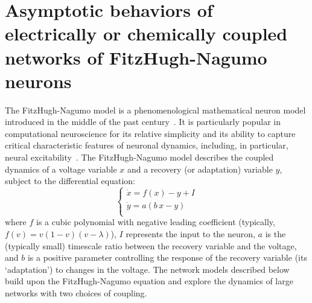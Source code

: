 \documentclass[onefignum,onetabnum]{siamart190516}
\newcommand{\1}{\mathbbm{1}}
\newcommand{\review}[1]{\textcolor{midblue}{ #1}}
\renewcommand{\review}[1]{{ #1}}
\begin{document}
\section{Asymptotic behaviors of electrically or chemically coupled networks of FitzHugh-Nagumo neurons}\label{sec:examples}
\review{The FitzHugh-Nagumo model is a phenomenological mathematical neuron model introduced in the middle of the past century~\cite{fitzhugh1955mathematical,nagumo1962active}. It is particularly popular in computational neuroscience for its relative simplicity and its ability to capture critical characteristic features of neuronal dynamics, including, in particular, neural excitability~\cite{cebrian2024six}. The FitzHugh-Nagumo model describes the coupled dynamics of a voltage variable $x$ and a recovery (or adaptation) variable $y$, subject to the differential equation:
\[
\begin{cases}
\dot{x}=f(x)-y+I\\
\dot{y}=a(b\,x-y)\\
\end{cases}
\]
where $f$ is a cubic polynomial with negative leading coefficient (typically, $f(v)=v(1-v)(v-\lambda)$), $I$ represents the input to the neuron, $a$ is the (typically small) timescale ratio between the recovery variable and the voltage, and $b$ is a positive parameter controlling the response of the recovery variable (its `adaptation') to changes in the voltage. The network models described below build upon the FitzHugh-Nagumo equation and explore the dynamics of large networks with two choices of coupling.}
\end{document}

